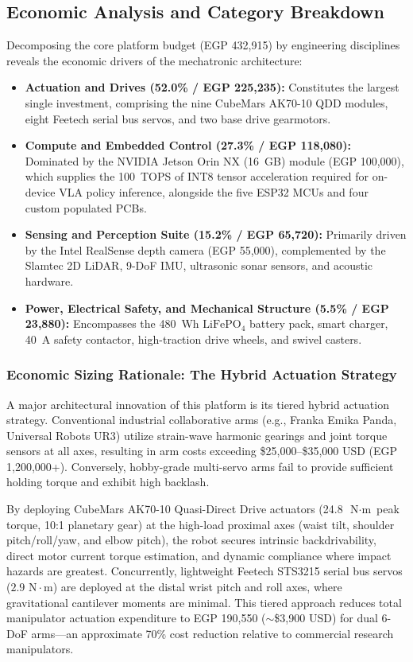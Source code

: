 \subsection{Economic Analysis and Category Breakdown}
Decomposing the core platform budget (EGP 432,915) by engineering disciplines reveals the economic drivers of the mechatronic architecture:
\begin{itemize}[leftmargin=1.5em]
  \item \textbf{Actuation and Drives (52.0\% / EGP 225,235):} Constitutes the largest single investment, comprising the nine CubeMars AK70-10 QDD modules, eight Feetech serial bus servos, and two base drive gearmotors.
  \item \textbf{Compute and Embedded Control (27.3\% / EGP 118,080):} Dominated by the NVIDIA Jetson Orin NX (16~GB) module (EGP 100,000), which supplies the 100~TOPS of INT8 tensor acceleration required for on-device VLA policy inference, alongside the five ESP32 MCUs and four custom populated PCBs.
  \item \textbf{Sensing and Perception Suite (15.2\% / EGP 65,720):} Primarily driven by the Intel RealSense depth camera (EGP 55,000), complemented by the Slamtec 2D LiDAR, 9-DoF IMU, ultrasonic sonar sensors, and acoustic hardware.
  \item \textbf{Power, Electrical Safety, and Mechanical Structure (5.5\% / EGP 23,880):} Encompasses the 480~Wh $\text{LiFePO}_4$ battery pack, smart charger, 40~A safety contactor, high-traction drive wheels, and swivel casters.
\end{itemize}

\subsubsection{Economic Sizing Rationale: The Hybrid Actuation Strategy}
A major architectural innovation of this platform is its tiered hybrid actuation strategy. Conventional industrial collaborative arms (e.g., Franka Emika Panda, Universal Robots UR3) utilize strain-wave harmonic gearings and joint torque sensors at all axes, resulting in arm costs exceeding \$25,000--\$35,000 USD (EGP 1,200,000+). Conversely, hobby-grade multi-servo arms fail to provide sufficient holding torque and exhibit high backlash.

By deploying CubeMars AK70-10 Quasi-Direct Drive actuators (24.8~$\text{N}\cdot\text{m}$ peak torque, 10:1 planetary gear) at the high-load proximal axes (waist tilt, shoulder pitch/roll/yaw, and elbow pitch), the robot secures intrinsic backdrivability, direct motor current torque estimation, and dynamic compliance where impact hazards are greatest. Concurrently, lightweight Feetech STS3215 serial bus servos ($2.9\text{ N}\cdot\text{m}$) are deployed at the distal wrist pitch and roll axes, where gravitational cantilever moments are minimal. This tiered approach reduces total manipulator actuation expenditure to EGP 190,550 ($\sim$\$3,900 USD) for dual 6-DoF arms---an approximate 70\% cost reduction relative to commercial research manipulators.


